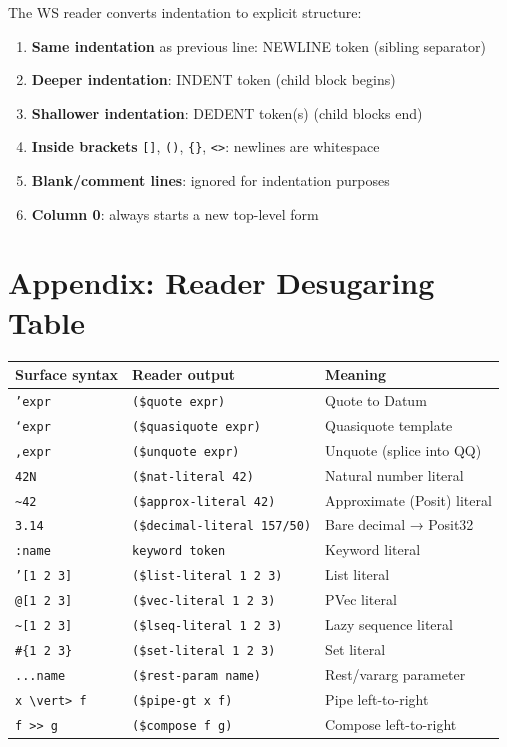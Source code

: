 \documentclass[11pt]{article}
\begin{document}
The WS reader converts indentation to explicit structure:

\begin{enumerate}
\item \textbf{Same indentation} as previous line: NEWLINE token (sibling separator)
\item \textbf{Deeper indentation}: INDENT token (child block begins)
\item \textbf{Shallower indentation}: DEDENT token(s) (child blocks end)
\item \textbf{Inside brackets} \texttt{[]}, \texttt{()}, \texttt{\{\}}, \texttt{<>}: newlines are whitespace
\item \textbf{Blank/comment lines}: ignored for indentation purposes
\item \textbf{Column 0}: always starts a new top-level form
\end{enumerate}
\section{Appendix: Reader Desugaring Table}
\label{sec:orgd158814}

\begin{center}
\begin{tabular}{lll}
Surface syntax & Reader output & Meaning\\
\hline
\texttt{'expr} & \texttt{(\$quote expr)} & Quote to Datum\\
\texttt{`expr} & \texttt{(\$quasiquote expr)} & Quasiquote template\\
\texttt{,expr} & \texttt{(\$unquote expr)} & Unquote (splice into QQ)\\
\texttt{42N} & \texttt{(\$nat-literal 42)} & Natural number literal\\
\texttt{\textasciitilde{}42} & \texttt{(\$approx-literal 42)} & Approximate (Posit) literal\\
\texttt{3.14} & \texttt{(\$decimal-literal 157/50)} & Bare decimal → Posit32\\
\texttt{:name} & \texttt{keyword token} & Keyword literal\\
\texttt{'[1 2 3]} & \texttt{(\$list-literal 1 2 3)} & List literal\\
\texttt{@[1 2 3]} & \texttt{(\$vec-literal 1 2 3)} & PVec literal\\
\texttt{\textasciitilde{}[1 2 3]} & \texttt{(\$lseq-literal 1 2 3)} & Lazy sequence literal\\
\texttt{\#\{1 2 3\}} & \texttt{(\$set-literal 1 2 3)} & Set literal\\
\texttt{...name} & \texttt{(\$rest-param name)} & Rest/vararg parameter\\
\texttt{x \textbackslash{}vert> f} & \texttt{(\$pipe-gt x f)} & Pipe left-to-right\\
\texttt{f >{}>{} g} & \texttt{(\$compose f g)} & Compose left-to-right\\
\end{tabular}
\end{center}
\end{document}
